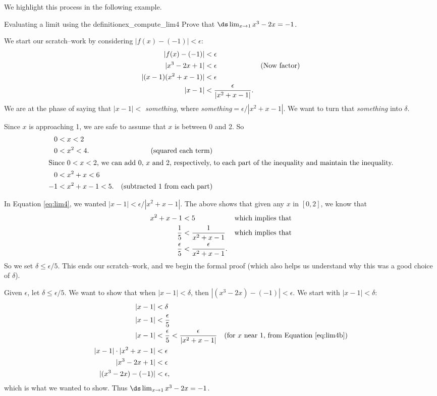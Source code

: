We highlight this process in the following example.\\


\begin{example}{Evaluating a limit using the definition}{ex_compute_lim4}
{Prove that $\ds \lim_{x\rightarrow 1}x^3-2x = -1$.}
\end{example}


\begin{solution}
{We start our scratch--work by considering $|f(x) - (-1)| < \epsilon$:
\begin{align}
|f(x)-(-1)| &< \epsilon \notag\\
|x^3-2x + 1|&< \epsilon & \text{(Now factor)}\notag\\
|(x-1)(x^2+x-1)|&< \epsilon \notag\\
|x-1| &<\frac{\epsilon}{|x^2+x-1|}.\label{eq:lim4}
\end{align}
We are at the phase of saying that $|x-1|<$ \textit{something}, where \textit{something}$=\epsilon/|x^2+x-1|$. We want to turn that \textit{something} into $\delta$.

Since $x$ is approaching 1, we are safe to assume that $x$ is between 0 and 2. So
\begin{align*}
0&< x<2  & \\
0&< x^2<4.&\text{(squared each term)}\\
\intertext{Since $0<x<2$, we can add $0$, $x$ and $2$, respectively, to each part of the inequality and maintain the inequality.}
0&< x^2+x<6 &\\
-1&< x^2+x-1<5.&\text{(subtracted 1 from each part)}
\end{align*}

In Equation \eqref{eq:lim4}, we wanted $|x-1|<\epsilon/|x^2+x-1|$. The above shows that given any $x$ in $[0,2]$, we know that 
\begin{align}
x^2+x-1 &< 5 &\text{which implies that}\notag\\
\frac15 &< \frac{1}{x^2+x-1} &\text{which implies that}\notag\\
\frac{\epsilon}5 &< \frac{\epsilon}{x^2+x-1}.\label{eq:lim4b}
\end{align}
 So we set $\delta \leq \epsilon/5$. This ends our scratch--work, and we begin the formal proof (which also helps us understand why this was a good choice of $\delta$).

Given $\epsilon$, let $\delta \leq \epsilon/5$. We want to show that when $|x-1|<\delta$, then $|(x^3-2x)-(-1)|<\epsilon$. We start with $|x-1|<\delta$:
\begin{align*}
|x-1| &< \delta \\
|x-1| &< \frac{\epsilon}5\\
|x-1| &< \frac\epsilon5 < \frac{\epsilon}{|x^2+x-1|} & \text{(for $x$ near 1, from Equation \eqref{eq:lim4b})}\\
|x-1|\cdot |x^2+x-1| &< \epsilon\\
|x^3-2x+1| &< \epsilon\\
|(x^3-2x)-(-1)| &<\epsilon,
\end{align*}
which is what we wanted to show. Thus $\ds \lim_{x\to 1}x^3-2x = -1$.
}
\end{solution}



